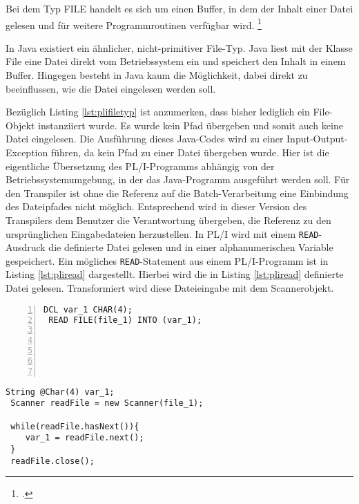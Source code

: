 Bei dem Typ FILE handelt es sich um einen Buffer, in dem der Inhalt einer Datei gelesen und für weitere Programmroutinen verfügbar wird. \footcite[Vgl. ][ S.305ff. ]{pliref}

In Java existiert ein ähnlicher, nicht-primitiver File-Typ.
Java liest mit der Klasse File eine Datei direkt vom Betriebssystem ein und speichert den Inhalt in einem Buffer. 
Hingegen besteht in Java kaum die Möglichkeit, dabei direkt zu beeinflussen, wie die Datei eingelesen werden soll.


Bezüglich Listing \ref{lst:plifiletyp} ist anzumerken, dass bisher lediglich ein File-Objekt instanziiert wurde.
Es wurde kein Pfad übergeben und somit auch keine Datei eingelesen. 
Die Ausführung dieses Java-Codes wird zu einer Input-Output-Exception führen, da kein Pfad zu einer Datei übergeben wurde. Hier ist die eigentliche Übersetzung des PL/I-Programms abhängig von der Betriebssystemumgebung, in der das Java-Programm ausgeführt werden soll. Für den Transpiler ist ohne die Referenz auf die Batch-Verarbeitung eine Einbindung des Dateipfades nicht möglich. Entsprechend wird in dieser Version des Transpilers dem Benutzer die Verantwortung übergeben, die Referenz zu den ursprünglichen Eingabedateien herzustellen. In PL/I wird mit einem \verb+READ+-Ausdruck die definierte Datei gelesen und in einer alphanumerischen Variable gespeichert. Ein mögliches \verb+READ+-Statement aus einem PL/I-Programm ist in Listing \ref{lst:pliread} dargestellt. Hierbei wird die in Listing \ref{lst:pliread} definierte Datei gelesen. Transformiert wird diese Dateieingabe mit dem Scannerobjekt.

\begin{minipage}[b]{0.48\linewidth}
	\centering
	\lstset{language=PL/I,label=SliceExaple}
	\begin{lstlisting}[frame=single, numbers=left, mathescape,%
		caption={Transformation Dateieingabe}, label={lst:pliread}, basicstyle=\fontsize{9}{13}\selectfont\ttfamily]
 DCL var_1 CHAR(4);
 READ FILE(file_1) INTO (var_1); 
		
		
		
		
		
	\end{lstlisting}
\end{minipage}
\hspace{0.5cm}
\begin{minipage}[b]{0.48\linewidth}
	\centering
	\lstset{language=Java,label=SliceExaple}
	\begin{lstlisting}[frame=single, mathescape,%
		title={" "},  basicstyle=\fontsize{9}{13}\selectfont\ttfamily]
 String @Char(4) var_1;
 Scanner readFile = new Scanner(file_1);
		
 while(readFile.hasNext()){
	var_1 = readFile.next();
 }
 readFile.close();
	\end{lstlisting}
\end{minipage}  


